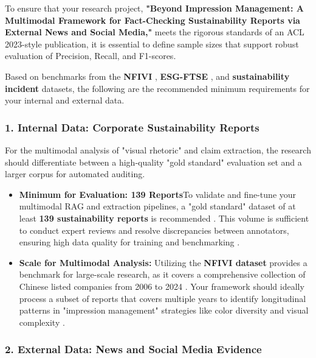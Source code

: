 \documentclass{article}
\begin{document}
To ensure that your research project, \textbf{"Beyond Impression Management: A Multimodal Framework for Fact-Checking Sustainability Reports via External News and Social Media,"} meets the rigorous standards of an ACL 2023-style publication, it is essential to define sample sizes that support robust evaluation of Precision, Recall, and F1-scores.

Based on benchmarks from the \textbf{NFIVI}  \parencite{bingjie_li_487d69fd}, \textbf{ESG-FTSE}  \parencite{mariya_pavlova_259be499}, and \textbf{sustainability incident}  \parencite{abir_naskar_17efeb7b} datasets, the following are the recommended minimum requirements for your internal and external data.
\subsubsection{1. Internal Data: Corporate Sustainability Reports}

For the multimodal analysis of "visual rhetoric" and claim extraction, the research should differentiate between a high-quality "gold standard" evaluation set and a larger corpus for automated auditing.
\begin{itemize}
\item 

\textbf{Minimum for Evaluation: 139 Reports}To validate and fine-tune your multimodal RAG and extraction pipelines, a "gold standard" dataset of at least \textbf{139 sustainability reports} is recommended  \parencite{jacob_beck_9548a833}. This volume is sufficient to conduct expert reviews and resolve discrepancies between annotators, ensuring high data quality for training and benchmarking  \parencite{jacob_beck_9548a833}.\item 

\textbf{Scale for Multimodal Analysis:} Utilizing the \textbf{NFIVI dataset} provides a benchmark for large-scale research, as it covers a comprehensive collection of Chinese listed companies from 2006 to 2024  \parencite{bingjie_li_487d69fd}. Your framework should ideally process a subset of reports that covers multiple years to identify longitudinal patterns in "impression management" strategies like color diversity and visual complexity  \parencite{bingjie_li_487d69fd}.
\end{itemize}
\subsubsection{2. External Data: News and Social Media Evidence}
\end{document}
